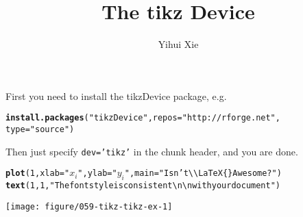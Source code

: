\documentclass{article}\usepackage[]{graphicx}\usepackage[]{color}
\title{The tikz Device}
\author{Yihui Xie}
\makeatletter
\def\maxwidth{ %
  \ifdim\Gin@nat@width>\linewidth
    \linewidth
  \else
    \Gin@nat@width
  \fi
}
\newcommand{\hlnum}[1]{\textcolor[rgb]{0.686,0.059,0.569}{#1}}%
\newcommand{\hlstr}[1]{\textcolor[rgb]{0.192,0.494,0.8}{#1}}%
\newcommand{\hlstd}[1]{\textcolor[rgb]{0.345,0.345,0.345}{#1}}%
\newcommand{\hlkwc}[1]{\textcolor[rgb]{0.333,0.667,0.333}{#1}}%
\newcommand{\hlkwd}[1]{\textcolor[rgb]{0.737,0.353,0.396}{\textbf{#1}}}%
\newenvironment{kframe}{%
 \def\at@end@of@kframe{}%
 \ifinner\ifhmode%
  \def\at@end@of@kframe{\end{minipage}}%
  \begin{minipage}{\columnwidth}%
 \fi\fi%
 \def\FrameCommand##1{\hskip\@totalleftmargin \hskip-\fboxsep
 \colorbox{shadecolor}{##1}\hskip-\fboxsep
     \hskip-\linewidth \hskip-\@totalleftmargin \hskip\columnwidth}%
 \MakeFramed {\advance\hsize-\width
   \@totalleftmargin\z@ \linewidth\hsize
   \@setminipage}}%
 {\par\unskip\endMakeFramed%
 \at@end@of@kframe}
\newenvironment{knitrout}{}{} %
\makeatother
\begin{document}
\maketitle


First you need to install the tikzDevice package, e.g.

\begin{knitrout}
\color{fgcolor}\begin{kframe}
\begin{alltt}
\hlkwd{install.packages}\hlstd{(}\hlstr{"tikzDevice"}\hlstd{,} \hlkwc{repos} \hlstd{=} \hlstr{"http://rforge.net"}\hlstd{,}
    \hlkwc{type} \hlstd{=} \hlstr{"source"}\hlstd{)}
\end{alltt}
\end{kframe}
\end{knitrout}

Then just specify \texttt{dev='tikz'} in the chunk header, and you are done.

\begin{knitrout}
\color{fgcolor}\begin{kframe}
\begin{alltt}
\hlkwd{plot}\hlstd{(}\hlnum{1}\hlstd{,} \hlkwc{xlab} \hlstd{=} \hlstr{"$x_i$"}\hlstd{,} \hlkwc{ylab} \hlstd{=} \hlstr{"$y_i$"}\hlstd{,} \hlkwc{main} \hlstd{=} \hlstr{"Isn't \textbackslash{}\textbackslash{}LaTeX\{\} Awesome?"}\hlstd{)}
\hlkwd{text}\hlstd{(}\hlnum{1}\hlstd{,} \hlnum{1}\hlstd{,} \hlstr{"The font style is consistent\textbackslash{}n\textbackslash{}n with your document"}\hlstd{)}
\end{alltt}
\end{kframe}
\texttt{[image: figure/059-tikz-tikz-ex-1]} 

\end{knitrout}
\end{document}
